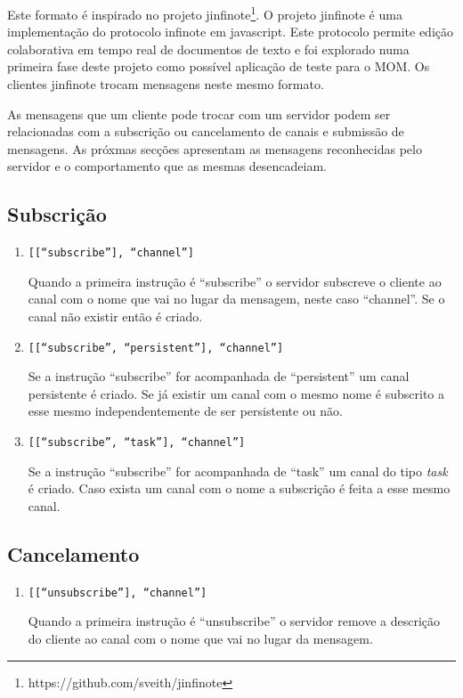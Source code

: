 Este formato é inspirado no projeto jinfinote\footnote{https://github.com/sveith/jinfinote}. O projeto jinfinote é uma implementação do protocolo infinote em javascript. Este protocolo permite edição colaborativa em tempo real de documentos de texto e foi explorado numa primeira fase deste projeto como possível aplicação de teste para o MOM. Os clientes jinfinote trocam mensagens neste mesmo formato.

As mensagens que um cliente pode trocar com um servidor podem ser relacionadas com a subscrição ou cancelamento de canais e submissão de mensagens. As próxmas secções apresentam as mensagens reconhecidas pelo servidor e o comportamento que as mesmas desencadeiam.

\subsection{Subscrição}
\begin{enumerate}
\item
\texttt{[[``subscribe''], ``channel'']}

Quando a primeira instrução é ``subscribe'' o servidor subscreve o cliente ao canal com o nome que vai no lugar da mensagem, neste caso ``channel''. Se o canal não existir então é criado.

\item
\texttt{[[``subscribe'', ``persistent''], ``channel'']}

Se a instrução ``subscribe'' for acompanhada de ``persistent'' um canal persistente é criado. Se já existir um canal com o mesmo nome é subscrito a esse mesmo independentemente de ser persistente ou não.

\item
\texttt{[[``subscribe'', ``task''], ``channel'']}

Se a instrução ``subscribe'' for acompanhada de ``task'' um canal do tipo \textit{task} é criado. Caso exista um canal com o nome a subscrição é feita a esse mesmo canal.
\end{enumerate}


\subsection{Cancelamento}
\begin{enumerate}
\item
\texttt{[[``unsubscribe''], ``channel'']}

Quando a primeira instrução é ``unsubscribe'' o servidor remove a descrição do cliente ao canal com o nome que vai no lugar da mensagem.
\end{enumerate}

